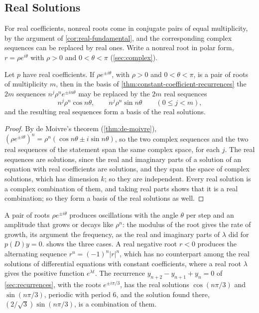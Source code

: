\subsection{Real Solutions}

For real coefficients, nonreal roots come in conjugate pairs of equal multiplicity, by the argument of \cref{cor:real-fundamental}, and the corresponding complex sequences can be replaced by real ones. Write a nonreal root in polar form, $r=\rho e^{i\theta}$ with $\rho>0$ and $0<\theta<\pi$ (\cref{sec:complex}).

\begin{corollary}
\label{cor:real-recurrence-solutions}
Let $p$ have real coefficients. If $\rho e^{\pm i\theta}$, with $\rho>0$ and $0<\theta<\pi$, is a pair of roots of multiplicity $m$, then in the basis of \cref{thm:constant-coefficient-recurrences} the $2m$ sequences $n^j\rho^ne^{\pm in\theta}$ may be replaced by the $2m$ real sequences
\[
n^j\rho^n\cos n\theta,\qquad n^j\rho^n\sin n\theta\qquad(0\le j<m),
\]
and the resulting real sequences form a basis of the real solutions.
\end{corollary}

\begin{proof}
By de Moivre's theorem (\cref{thm:de-moivre}), $(\rho e^{\pm i\theta})^n=\rho^n(\cos n\theta\pm i\sin n\theta)$, so the two complex sequences and the two real sequences of the statement span the same complex space, for each $j$. The real sequences are solutions, since the real and imaginary parts of a solution of an equation with real coefficients are solutions, and they span the space of complex solutions, which has dimension $k$; so they are independent. Every real solution is a complex combination of them, and taking real parts shows that it is a real combination; so they form a basis of the real solutions as well.
\end{proof}

A pair of roots $\rho e^{\pm i\theta}$ produces oscillations with the angle $\theta$ per step and an amplitude that grows or decays like $\rho^n$: the modulus of the root gives the rate of growth, its argument the frequency, as the real and imaginary parts of $\lambda$ did for $p(D)y=0$.  shows the three cases. A real negative root $r<0$ produces the alternating sequence $r^n=(-1)^n|r|^n$, which has no counterpart among the real solutions of differential equations with constant coefficients, where a real root $\lambda$ gives the positive function $e^{\lambda t}$. The recurrence $y_{n+2}-y_{n+1}+y_n=0$ of \cref{sec:recurrences}, with the roots $e^{\pm i\pi/3}$, has the real solutions $\cos(n\pi/3)$ and $\sin(n\pi/3)$, periodic with period $6$, and the solution found there, $(2/\sqrt3)\sin(n\pi/3)$, is a combination of them.

